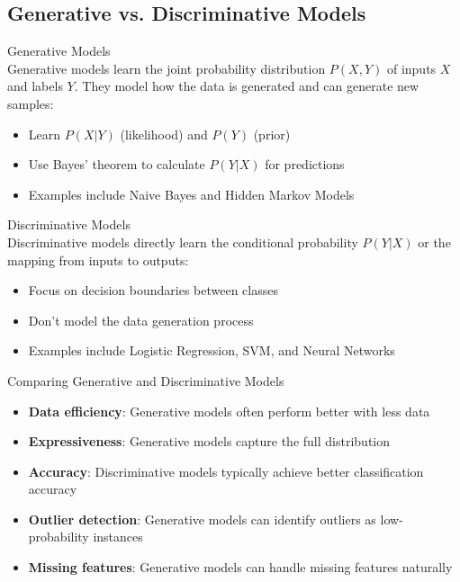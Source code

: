 \subsection{Generative vs. Discriminative Models}

\begin{definition}{Generative Models}\\
Generative models learn the joint probability distribution $P(X, Y)$ of inputs $X$ and labels $Y$. They model how the data is generated and can generate new samples:
\begin{itemize}
    \item Learn $P(X|Y)$ (likelihood) and $P(Y)$ (prior)
    \item Use Bayes' theorem to calculate $P(Y|X)$ for predictions
    \item Examples include Naive Bayes and Hidden Markov Models
\end{itemize}
\end{definition}

\begin{definition}{Discriminative Models}\\
Discriminative models directly learn the conditional probability $P(Y|X)$ or the mapping from inputs to outputs:
\begin{itemize}
    \item Focus on decision boundaries between classes
    \item Don't model the data generation process
    \item Examples include Logistic Regression, SVM, and Neural Networks
\end{itemize}
\end{definition}

\begin{concept}{Comparing Generative and Discriminative Models}\\
\begin{itemize}
    \item \textbf{Data efficiency}: Generative models often perform better with less data
    \item \textbf{Expressiveness}: Generative models capture the full distribution
    \item \textbf{Accuracy}: Discriminative models typically achieve better classification accuracy
    \item \textbf{Outlier detection}: Generative models can identify outliers as low-probability instances
    \item \textbf{Missing features}: Generative models can handle missing features naturally
\end{itemize}
\end{concept}

